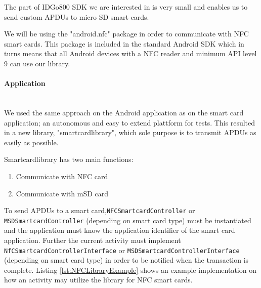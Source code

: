 The part of IDGo800 SDK we are interested in is very small and enables us to send custom APDUs to micro SD smart cards.

We will be using the "android.nfc" package in order to communicate with NFC smart cards. This package is included in the standard Android SDK which in turns means that all Android devices with a NFC reader and minimum API level 9 \cite{androidNFCminSDK} can use our library.

\paragraph{Application}\mbox{}\\
We used the same approach on the Android application as on the smart card application; an autonomous and easy to extend plattform for tests. This resulted in a new library, "smartcardlibrary",  which sole purpose is to transmit APDUs as easily as possible.

Smartcardlibrary has two main functions:
\begin{enumerate}
    \item{Communicate with NFC card}
    \item{Communicate with mSD card}
\end{enumerate}

To send APDUs to a smart card,\texttt{NFCSmartcardController} or\\ \texttt{MSDSmartcardController} (depending on smart card type) must be instantiated and the application must know the application identifier of the smart card application. Further the current activity must implement\\ \texttt{NfCSmartcardControllerInterface} or \texttt{MSDSmartcardControllerInterface} (depending on smart card type) in order to be notified when the transaction is complete. Listing \ref{lst:NFCLibraryExample} shows an example implementation on how an activity may utilize the library for NFC smart cards.

